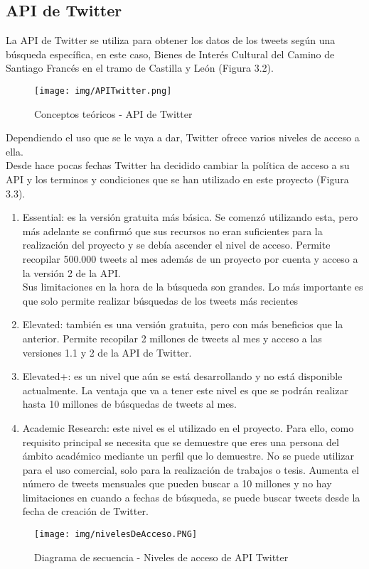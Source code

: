 \subsection{API de Twitter}

La API de Twitter \cite{apiTwitter} se utiliza para obtener los datos de los tweets según una búsqueda específica, en este caso, Bienes de Interés Cultural del Camino de Santiago Francés en el tramo de Castilla y León (Figura 3.2). \\
\begin{figure}[h!]
    \centering
    \texttt{[image: img/APITwitter.png]}
    \caption{Conceptos teóricos - API de Twitter}
    \label{Conceptos teóricos - API de Twitter}
\end{figure}

Dependiendo el uso que se le vaya a dar, Twitter ofrece varios niveles de acceso a ella.\\
Desde hace pocas fechas Twitter ha decidido cambiar la política de acceso a su API y los terminos y condiciones que se han utilizado en este proyecto (Figura 3.3).

\begin{enumerate}
    \item {Essential:} es la versión gratuita más básica. Se comenzó utilizando esta, pero más adelante se confirmó que sus recursos no eran suficientes para la realización del proyecto y se debía ascender el nivel de acceso. Permite recopilar 500.000 tweets al mes además de un proyecto por cuenta y acceso a la versión 2 de la API.\\ Sus limitaciones en la hora de la búsqueda son grandes. Lo más importante es que solo permite realizar búsquedas de los tweets más recientes
    
    \item {Elevated:} también es una versión gratuita, pero con más beneficios que la anterior. Permite recopilar 2 millones de tweets al mes y acceso a las versiones 1.1 y 2 de la API de Twitter.
    
    \item {Elevated+:} es un nivel que aún se está desarrollando y no está disponible actualmente. La ventaja que va a tener este nivel es que se podrán realizar hasta 10 millones de búsquedas de tweets al mes.
    
    \item {Academic Research:} este nivel es el utilizado en el proyecto. Para ello, como requisito principal se necesita que se demuestre que eres una persona del ámbito académico mediante un perfil que lo demuestre. No se puede utilizar para el uso comercial, solo para la realización de trabajos o tesis. Aumenta el número de tweets mensuales que pueden buscar a 10 millones y no hay  limitaciones en cuando a fechas de búsqueda, se puede buscar tweets desde la fecha de creación de Twitter.
    
\end{enumerate}
\begin{figure}[h!]
    \centering
    \texttt{[image: img/nivelesDeAcceso.PNG]}
    \caption{Diagrama de secuencia - Niveles de acceso de API Twitter}
    \label{Diagrama de secuencia - Niveles de acceso de API Twitter}
\end{figure}


